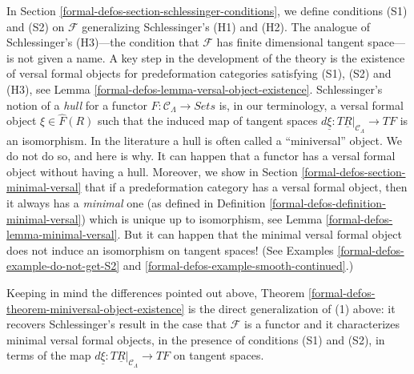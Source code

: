 \medskip\noindent
In
Section \ref{formal-defos-section-schlessinger-conditions},
we define conditions (S1) and (S2) on $\mathcal{F}$ generalizing
Schlessinger's (H1) and (H2). The analogue of Schlessinger's
(H3)---the condition that $\mathcal{F}$ has finite dimensional
tangent space---is not given a name.
A key step in the development of the theory is the existence of
versal formal objects for predeformation categories satisfying
(S1), (S2) and (H3), see
Lemma \ref{formal-defos-lemma-versal-object-existence}.
Schlessinger's notion of a {\it hull} for a functor
$F : \mathcal{C}_\Lambda \to \textit{Sets}$
is, in our terminology, a versal formal object $\xi \in \widehat{F}(R)$
such that the induced map of tangent spaces
$d\underline{\xi} : T\underline{R}|_{\mathcal{C}_\Lambda} \to TF$
is an isomorphism.
In the literature a hull is often called a ``miniversal'' object.
We do not do so, and here is why. It can happen that a functor has a
versal formal object without having a hull. Moreover, we show in
Section \ref{formal-defos-section-minimal-versal}
that if a predeformation category has a versal formal object, then
it always has a {\it minimal} one (as defined in
Definition \ref{formal-defos-definition-minimal-versal})
which is unique up to isomorphism, see
Lemma \ref{formal-defos-lemma-minimal-versal}.
But it can happen that the minimal versal formal object does not
induce an isomorphism on tangent spaces! (See
Examples \ref{formal-defos-example-do-not-get-S2} and
\ref{formal-defos-example-smooth-continued}.)

\medskip\noindent
Keeping in mind the differences pointed out above,
Theorem \ref{formal-defos-theorem-miniversal-object-existence}
is the direct generalization of (1) above: it recovers Schlessinger's
result in the case that $\mathcal{F}$ is a functor and it characterizes
minimal versal formal objects, in the presence of conditions
(S1) and (S2), in terms of the map
$d\underline{\xi} : T\underline{R}|_{\mathcal{C}_\Lambda} \to TF$
on tangent spaces.

